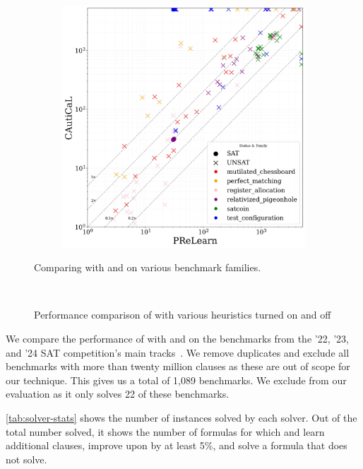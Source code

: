 \begin{figure}[!h]
\begin{subfigure}[t]{0.45\textwidth}
        \includegraphics[width=\textwidth]{figs/prelearn_vs_cautical_interesting_legend.jpg}
        \label{fig:cautical-vs-prelearn}
    \end{subfigure}

    \caption{Comparing \tool with \cadical and \prelearn on various benchmark families.}
    \label{fig:solver-comparison-familis}
\end{figure}

\begin{figure}[!t]
    \centering
    
    \caption{Performance comparison of \tool with various heuristics turned on and off}~\label{fig:global-heuristics}
\end{figure}

We compare the performance of \tool with \cadical and \prelearn on the
benchmarks from the '22, '23, and '24 SAT competition's main
tracks~\cite{satcomp2022,satcomp2023,satcomp2024}. We remove duplicates and
exclude all benchmarks with more than twenty million clauses as these are out of
scope for our technique. This gives us a total of 1,089 benchmarks. We exclude
\sadical from our evaluation as it only solves 22 of these benchmarks.

\autoref{tab:solver-stats} shows the number of instances solved by each solver.
Out of the total number solved, it shows the number of formulas for which
\prelearn and \tool learn additional \pr clauses, improve upon \cadical by at
least 5\%, and solve a formula that \cadical does not solve. 

